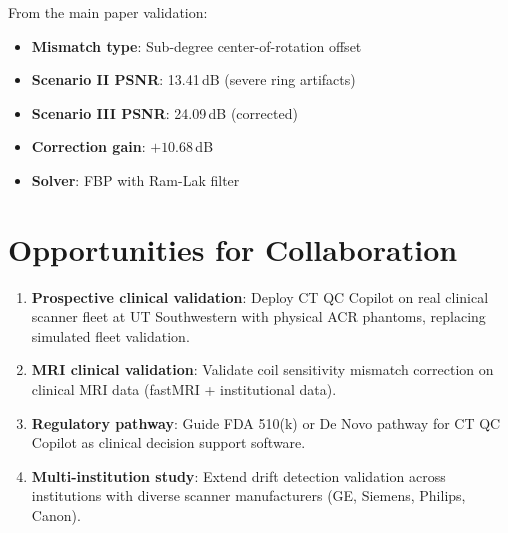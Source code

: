 \documentclass[11pt]{article}
\begin{document}
From the main paper validation:
\begin{itemize}
  \item \textbf{Mismatch type}: Sub-degree center-of-rotation offset
  \item \textbf{Scenario II PSNR}: 13.41\,dB (severe ring artifacts)
  \item \textbf{Scenario III PSNR}: 24.09\,dB (corrected)
  \item \textbf{Correction gain}: $+10.68$\,dB
  \item \textbf{Solver}: FBP with Ram-Lak filter
\end{itemize}

\section*{Opportunities for Collaboration}

\begin{enumerate}
  \item \textbf{Prospective clinical validation}: Deploy CT QC Copilot on real clinical scanner fleet at UT Southwestern with physical ACR phantoms, replacing simulated fleet validation.
  \item \textbf{MRI clinical validation}: Validate coil sensitivity mismatch correction on clinical MRI data (fastMRI + institutional data).
  \item \textbf{Regulatory pathway}: Guide FDA 510(k) or De Novo pathway for CT QC Copilot as clinical decision support software.
  \item \textbf{Multi-institution study}: Extend drift detection validation across institutions with diverse scanner manufacturers (GE, Siemens, Philips, Canon).
\end{enumerate}
\end{document}
